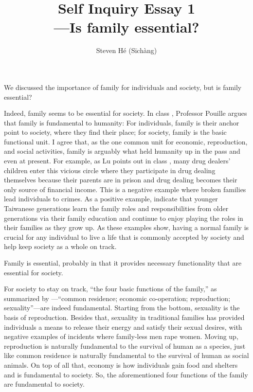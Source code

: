 \documentclass[12pt]{article}
\title{Self Inquiry Essay 1\\—Is family essential?}
\author{Steven Hé (Sīchàng)}
\begin{document}
\maketitle
We discussed the importance of family for individuals and society,
but is family essential?

Indeed, family seems to be essential for society.
In class \citep{pouille2023ethics},
Professor Pouille argues that family is fundamental to humanity:
For individuals, family is their anchor point to society,
where they find their place;
for society, family is the basic functional unit.
I agree that, as the one common unit for economic, reproduction, and social
activities, family is arguably what held humanity up in the pass and even at
present.
For example, as Lu points out in class \citep{pouille2023ethics},
many drug dealers' children enter this vicious circle where
they participate in drug dealing themselves because their parents are in prison
and drug dealing becomes their only source of financial income.
This is a negative example where broken families lead individuals to crimes.
As a positive example, \citet{lu1998family} indicate that
younger Taiwanese generations learn the family roles and responsibilities from
older generations via their family education and
continue to enjoy playing the roles in their families as they grow up.
As these examples show, having a normal family is crucial for any individual to
live a life that is commonly accepted by society and help keep society as a
whole on track.

Family is essential, probably in that it provides necessary functionality
that are essential for society.

For society to stay on track, ``the four basic functions of the family,''
as summarized by \citet[p. 60]{gittins1993family}—``common residence;
economic co-operation; reproduction; sexuality''—are indeed fundamental.
Starting from the bottom, sexuality is the basis of reproduction.
Besides that, sexuality in traditional families has provided individuals
a means to release their energy and satisfy their sexual desires,
with negative examples of incidents where family-less men rape women.
Moving up, reproduction is naturally fundamental to the survival of human as
a species, just like common residence is naturally fundamental to the survival
of human as social animals.
On top of all that, economy is how individuals gain food and shelters and
is fundamental to society.
So, the aforementioned four functions of the family are fundamental to society.
\end{document}
